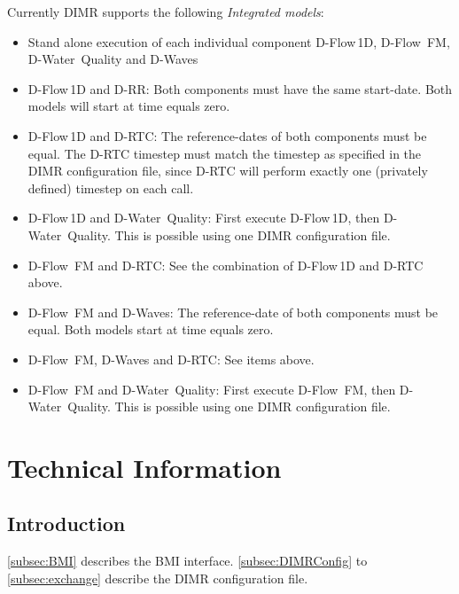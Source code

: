 \documentclass[signature]{deltares_manual}
\newcommand{\dwaves}{D-Waves\xspace}
\newcommand{\dwaqfull}{\textrm{D-Water~Quality}\xspace}
\newcommand{\dwaq}{\dwaqfull}
\newcommand{\dflowfm}{\textrm{D-Flow~FM}\xspace}
\newcommand{\dflowoned}{D-Flow\,1D\xspace}
\newcommand{\drr}{D-RR\xspace}
\newcommand{\drtc}{D-RTC\xspace}
\newcommand{\dimr}{\textrm{DIMR}\xspace}
\begin{document}
Currently \dimr supports the following \textit{Integrated models}:
\begin{itemize}
	\item Stand alone execution of each individual component \dflowoned, \dflowfm, \dwaq and \dwaves
	\item \dflowoned and \drr: Both components must have the same start-date. Both models will start at time equals zero.
	\item \dflowoned and \drtc: The reference-dates of both components must be equal. The \drtc timestep must match the timestep as specified in the \dimr configuration file, since \drtc will perform exactly one (privately defined) timestep on each call.
	\item \dflowoned and \dwaq: First execute \dflowoned, then \dwaq. This is possible using one \dimr configuration file.
	\item \dflowfm and \drtc: See the combination of \dflowoned and \drtc above.
	\item \dflowfm and \dwaves: The reference-date of both components must be equal. Both models start at time equals zero.
	\item \dflowfm , \dwaves and \drtc: See items above.
	\item \dflowfm and \dwaq: First execute \dflowfm, then \dwaq. This is possible using one \dimr configuration file.
\end{itemize}

\section{Technical Information} \label{chap:DIMR_technical}

\subsection{Introduction} 
\label{subsec:TechnicalIntroduction}
\autoref{subsec:BMI} describes the BMI interface. \autoref{subsec:DIMRConfig} to \autoref{subsec:exchange} describe the \dimr configuration file.
\end{document}
